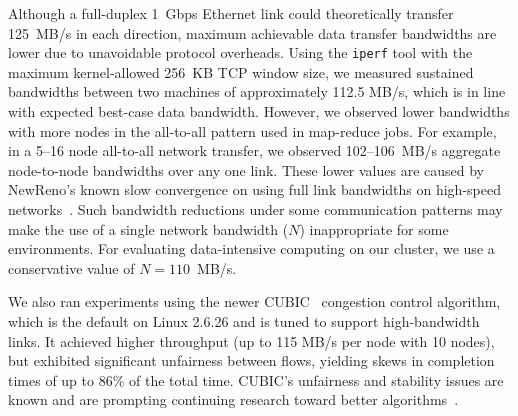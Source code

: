 Although a full-duplex 1~Gbps Ethernet link could theoretically
transfer 125~MB/s in each direction, maximum achievable data transfer
bandwidths are lower due to unavoidable protocol overheads.
Using the \texttt{iperf} tool with the maximum kernel-allowed 256~KB TCP
window size, we measured sustained bandwidths between two machines of
approximately 112.5 MB/s, which is in line with expected best-case
data bandwidth.
However, we observed lower bandwidths with more nodes in the all-to-all
pattern used in map-reduce jobs.
For example, in a 5--16 node all-to-all network transfer, we observed
102--106~MB/s aggregate node-to-node bandwidths over any one link.
These lower values are caused by NewReno's known slow convergence on
using full link bandwidths on high-speed networks~\cite{rapid-tcp}.
Such bandwidth reductions under some communication patterns may make
the use of a single network bandwidth ($N$) inappropriate for some environments.
For evaluating data-intensive computing on our cluster,
we use a conservative value of $N=110$~MB/s.

We also ran experiments using the newer CUBIC~\cite{cubic-tcp} congestion
control algorithm, which is the default on Linux 2.6.26 and is tuned to
support high-bandwidth links.
It achieved higher throughput (up to 115 MB/s per node with 10 nodes), but
exhibited significant unfairness between flows, yielding skews in
completion times of up to 86\% of the total time.
CUBIC's unfairness and stability issues are known and are prompting
continuing research toward better algorithms~\cite{rapid-tcp}.
